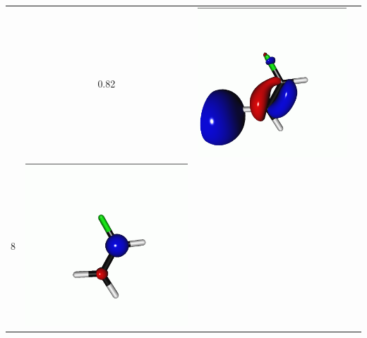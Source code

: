 \documentclass[journal=jctcce,manuscript=article]{achemso}
\begin{document}
\begin{table}[H]
\begin{tabular}{ c | c c c }
\begin{minipage}{0.2\textwidth}
     \end{minipage}
     & 0.82
     &  \begin{minipage}{0.2\textwidth}
         \centering
         \includegraphics[scale=0.10]{NTO/CH2CHF/4p.png}
     \end{minipage}
     \\
                  8 &  
     \begin{minipage}{0.2\textwidth}
         \centering
         \includegraphics[scale=0.10]{NTO/CH2CHF/8h.png}

\end{minipage}
\end{tabular}
\end{table}
\end{document}
